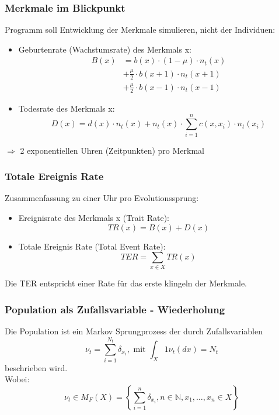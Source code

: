 \documentclass{beamer}
\begin{document}
	\begin{frame}
		\frametitle{Merkmale im Blickpunkt}
		Programm soll Entwicklung der Merkmale simulieren, nicht der Individuen:
		\pause
		\begin{itemize}
			\item Geburtenrate (Wachstumsrate) des Merkmals x: 
			\begin{align*}
				B(x) & = b(x) \cdot (1 - \mu) \cdot n_t(x) \\
				& + \frac{\mu}{2} \cdot b(x+1)\cdot n_t(x+1) \\ 
				& + \frac{\mu}{2} \cdot b(x-1)\cdot n_t(x-1)
			\end{align*}
			\pause
			\item Todesrate des Merkmals x: 
			\[ D(x) = d(x) \cdot n_t(x) + n_t(x) \cdot \sum_{i=1}^{n} c(x,x_i) \cdot n_t(x_i) \]
		\end{itemize}
		\pause
		$ \Rightarrow $ 2 exponentiellen Uhren (Zeitpunkten) pro Merkmal
	\end{frame}	
	\begin{frame}
		\frametitle{Totale Ereignis Rate}
		Zusammenfassung zu einer Uhr pro Evolutionssprung:
		\pause
		\begin{itemize}
			\item Ereignisrate des Merkmals x (Trait Rate):
				\[ TR(x) = B(x) + D(x) \]
			\item Totale Ereignis Rate (Total Event Rate): 
			\[ TER = \sum_{x \in X} TR(x)\]
		\end{itemize}
		Die TER entspricht einer Rate für das erste klingeln der Merkmale.
	\end{frame}
	\begin{frame}
		\frametitle{Population als Zufallsvariable - Wiederholung}
		\pause
		Die Population ist ein Markov Sprungprozess der durch Zufallsvariablen
		\[ \nu_t = \sum_{i=1}^{N_t} \delta_{x_i}, \text{ mit } \int_X 1\nu_t(dx) = N_t \]
		beschrieben wird.\\
		Wobei:
		\[ \nu_t \in M_F(X) = \left\{ \sum_{i=1}^{n} \delta_{x_i}, n \in \mathbb{N}, x_1, \dots, x_n \in X \right\} \]
	\end{frame}
	
	
\end{document}
